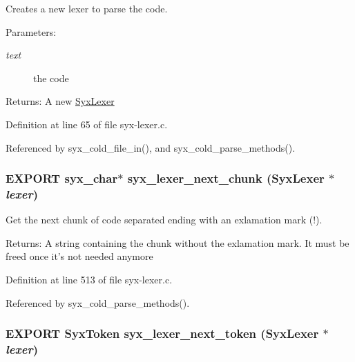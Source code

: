 Creates a new lexer to parse the code.

\begin{Desc}
\item[Parameters:]
\begin{description}
\item[{\em text}]the code \end{description}
\end{Desc}
\begin{Desc}
\item[Returns:]A new \hyperlink{struct_syx_lexer}{SyxLexer} \end{Desc}


Definition at line 65 of file syx-lexer.c.

Referenced by syx\_\-cold\_\-file\_\-in(), and syx\_\-cold\_\-parse\_\-methods().\hypertarget{syx-lexer_8h_061a773b9e83d79b82913bc1397afb6d}{
\subsubsection{\setlength{\rightskip}{0pt plus 5cm}EXPORT {\bf syx\_\-char}$\ast$ syx\_\-lexer\_\-next\_\-chunk ({\bf SyxLexer} $\ast$ {\em lexer})}}
\label{syx-lexer_8h_061a773b9e83d79b82913bc1397afb6d}


Get the next chunk of code separated ending with an exlamation mark (!).

\begin{Desc}
\item[Returns:]A string containing the chunk without the exlamation mark. It must be freed once it's not needed anymore \end{Desc}


Definition at line 513 of file syx-lexer.c.

Referenced by syx\_\-cold\_\-parse\_\-methods().\hypertarget{syx-lexer_8h_3d9cd96e5073feeb727cf1e53db5a7c0}{
\subsubsection{\setlength{\rightskip}{0pt plus 5cm}EXPORT {\bf SyxToken} syx\_\-lexer\_\-next\_\-token ({\bf SyxLexer} $\ast$ {\em lexer})}}
\label{syx-lexer_8h_3d9cd96e5073feeb727cf1e53db5a7c0}


